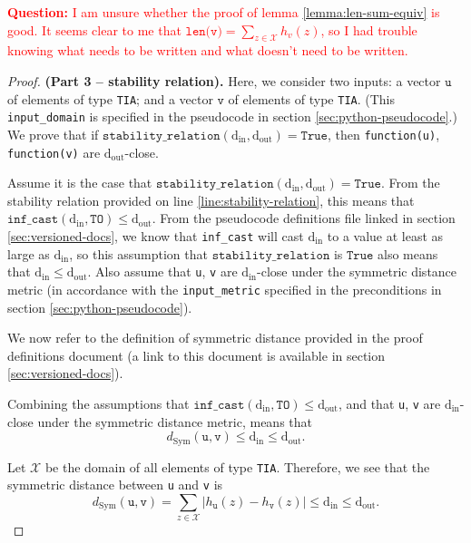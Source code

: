 \documentclass[11pt,letterpaper]{article}
\newcommand{\din}{\mathrm{d_{in}}}
\newcommand{\dout}{\mathrm{d_{out}}}
\newcommand{\question}[1]{\textcolor{red}{\textbf{Question:} #1}}
\newcommand{\True}{\texttt{True}}
\theoremstyle{definition}
\begin{document}
\question{I am unsure whether the proof of lemma \ref{lemma:len-sum-equiv} is good. It seems clear to me that $\texttt{len(v)} = \sum_{z\in\mathcal{X}} h_v(z)$, so I had trouble knowing what needs to be written and what doesn't need to be written.}

\begin{proof} \textbf{(Part 3 -- stability relation).} Here, we consider two inputs: a vector $\texttt{u}$ of elements of type \texttt{TIA}; and a vector $\texttt{v}$ of elements of type \texttt{TIA}. (This \texttt{input\_domain} is specified in the pseudocode in section \ref{sec:python-pseudocode}.) We prove that if $\texttt{stability\_relation}(\din, \dout) = \True$, then \texttt{function(u)}, \texttt{function(v)} are $\dout$-close.

Assume it is the case that $\texttt{stability\_relation}(\din, \dout) = \True$. From  the stability relation provided on line \ref{line:stability-relation}, this means that $\texttt{inf\_cast}(\din, \texttt{TO}) \leq \dout$. From the pseudocode definitions file linked in section \ref{sec:versioned-docs}, we know that \texttt{inf\_cast} will cast $\din$ to a value at least as large as $\din$, so this assumption that $\texttt{stability\_relation}$ is $\True$ also means that $\din \leq \dout$. Also assume that \texttt{u}, \texttt{v} are $\din$-close under the symmetric distance metric (in accordance with the \texttt{input\_metric} specified in the preconditions in section \ref{sec:python-pseudocode}).

We now refer to the definition of symmetric distance provided in the proof definitions document (a link to this document is available in section \ref{sec:versioned-docs}).

Combining the assumptions that $\texttt{inf\_cast}(\din, \texttt{TO}) \leq \dout$, and that \texttt{u}, \texttt{v} are $\din$-close under the symmetric distance metric, means that
\begin{equation}
    d_\text{Sym}(\texttt{u}, \texttt{v})
    \leq \din \leq \dout.
\end{equation}

Let $\mathcal{X}$ be the domain of all elements of type \texttt{TIA}. Therefore, we see that the symmetric distance  between \texttt{u} and \texttt{v} is 
\begin{equation}
\label{eq:expand-dymm-dist}
    d_\text{Sym}(\texttt{u}, \texttt{v}) = \sum_{z\in \mathcal{X}} |h_{\texttt{u}}(z) - h_{\texttt{v}}(z)| \leq \din \leq \dout.
\end{equation}


\end{proof}
\end{document}
